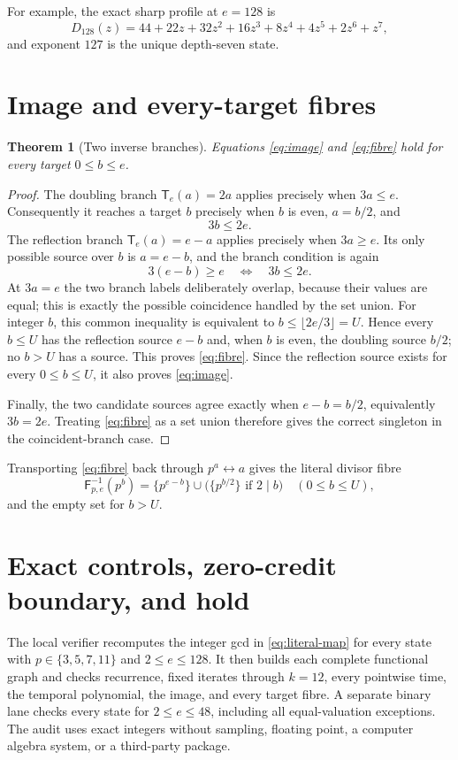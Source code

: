 \documentclass[10pt,a4paper]{amsart}
\newtheorem{theorem}{Theorem}[section]
\theoremstyle{definition}
\theoremstyle{remark}
\newcommand{\F}{\mathsf F}
\newcommand{\T}{\mathsf T}
\begin{document}
For example, the exact sharp profile at $e=128$ is
\[
 D_{128}(z)=44+22z+32z^2+16z^3+8z^4+4z^5+2z^6+z^7,
\]
and exponent $127$ is the unique depth-seven state.

\section{Image and every-target fibres}

\begin{theorem}[Two inverse branches]\label{thm:fibres}
Equations \eqref{eq:image} and \eqref{eq:fibre} hold for every target
$0\leq b\leq e$.
\end{theorem}

\begin{proof}
The doubling branch $\T_e(a)=2a$ applies precisely when $3a\leq e$.
Consequently it reaches a target $b$ precisely when $b$ is even,
$a=b/2$, and
\[
 3b\leq2e.
\]
The reflection branch $\T_e(a)=e-a$ applies precisely when $3a\geq e$.
Its only possible source over $b$ is $a=e-b$, and the branch condition is
again
\[
 3(e-b)\geq e\quad\Longleftrightarrow\quad3b\leq2e.
\]
At $3a=e$ the two branch labels deliberately overlap, because their values
are equal; this is exactly the possible coincidence handled by the set union.
For integer $b$, this common inequality is equivalent to
$b\leq\lfloor2e/3\rfloor=U$.  Hence every $b\leq U$ has the reflection
source $e-b$ and, when $b$ is even, the doubling source $b/2$; no $b>U$ has
a source.  This proves \eqref{eq:fibre}.  Since the reflection source exists
for every $0\leq b\leq U$, it also proves \eqref{eq:image}.

Finally, the two candidate sources agree exactly when
$e-b=b/2$, equivalently $3b=2e$.  Treating \eqref{eq:fibre} as a set union
therefore gives the correct singleton in the coincident-branch case.
\end{proof}

Transporting \eqref{eq:fibre} back through $p^a\leftrightarrow a$ gives the
literal divisor fibre
\[
 \F_{p,e}^{-1}(p^b)=
 \{p^{e-b}\}\cup
 \bigl(\{p^{b/2}\}\text{ if }2\mid b\bigr)
 \quad(0\leq b\leq U),
\]
and the empty set for $b>U$.

\section{Exact controls, zero-credit boundary, and hold}

The local verifier recomputes the integer gcd in \eqref{eq:literal-map} for
every state with $p\in\{3,5,7,11\}$ and $2\leq e\leq128$.  It then builds
each complete functional graph and checks recurrence, fixed iterates through
$k=12$, every pointwise time, the temporal polynomial, the image, and every
target fibre.  A separate binary lane checks every state for
$2\leq e\leq48$, including all equal-valuation exceptions.  The audit uses
exact integers without sampling, floating point, a computer algebra system,
or a third-party package.
\end{document}
